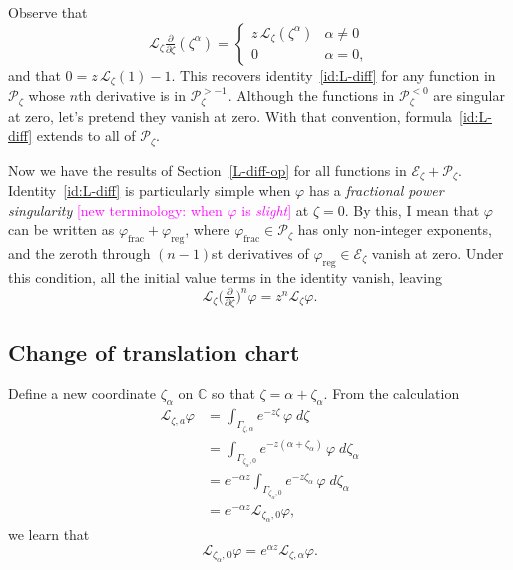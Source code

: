 \documentclass{article}
\theoremstyle{plain}
\newcommand{\C}{\mathbb{C}}
\newcommand{\laplace}{\mathcal{L}}
\begin{document}
Observe that
\[ \laplace_\zeta\tfrac{\partial}{\partial \zeta}(\zeta^\alpha) = \begin{cases}
z\,\laplace_\zeta(\zeta^\alpha) & \alpha \neq 0 \\
0 & \alpha = 0,
\end{cases} \]
and that $0 = z\,\laplace_\zeta(1) - 1$. This recovers identity~\ref{id:L-diff} for any function in $\mathcal{P}_\zeta$ whose $n$th derivative is in $\mathcal{P}_\zeta^{> -1}$. Although the functions in $\mathcal{P}_\zeta^{< 0}$ are singular at zero, let's pretend they vanish at zero. With that convention, formula~\ref{id:L-diff} extends to all of $\mathcal{P}_\zeta$.

Now we have the results of Section~\ref{L-diff-op} for all functions in $\mathcal{E}_\zeta + \mathcal{P}_\zeta$. Identity~\ref{id:L-diff} is particularly simple when $\varphi$ has a {\em fractional power singularity} \textcolor{magenta}{[new terminology: when $\varphi$ is {\em slight}]} at $\zeta = 0$. By this, I mean that $\varphi$ can be written as $\varphi_\text{frac} + \varphi_\text{reg}$, where $\varphi_\text{frac} \in \mathcal{P}_\zeta$ has only non-integer exponents, and the zeroth through $(n-1)$st derivatives of $\varphi_\text{reg} \in \mathcal{E}_\zeta$ vanish at zero. Under this condition, all the initial value terms in the identity vanish, leaving
\[ \laplace_\zeta \big(\tfrac{\partial}{\partial \zeta}\big)^n \varphi = z^n \laplace_\zeta \varphi. \]
\color{black}
\subsection{Change of translation chart}\label{translation}
Define a new coordinate $\zeta_\alpha$ on $\C$ so that $\zeta = \alpha + \zeta_\alpha$. From the calculation
\begin{align*}
\laplace_{\zeta, a} \varphi & = \int_{\Gamma_{\zeta, \alpha}} e^{-z \zeta}\,\varphi\;d\zeta \\
& = \int_{\Gamma_{\zeta_\alpha, 0}} e^{-z(\alpha + \zeta_\alpha)}\,\varphi\;d\zeta_\alpha \\
& = e^{-\alpha z} \int_{\Gamma_{\zeta_\alpha, 0}} e^{-z\zeta_\alpha}\,\varphi\;d\zeta_\alpha \\
& = e^{-\alpha z} \laplace_{\zeta_\alpha, 0} \varphi,
\end{align*}
we learn that
\[ \laplace_{\zeta_\alpha, 0} \varphi = e^{\alpha z} \laplace_{\zeta, \alpha} \varphi. \]
\end{document}
